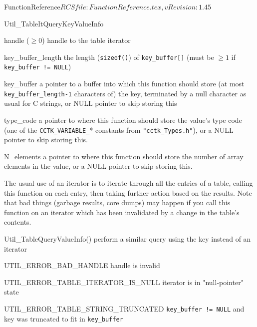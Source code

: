 \begin{cactuspart}{5}{FunctionReference}{$RCSfile: FunctionReference.tex,v $}{$Revision: 1.45 $}
\begin{FunctionDescription}{Util\_TableItQueryKeyValueInfo}
\begin{Parameter}{handle ($\ge 0$)}
handle to the table iterator
\end{Parameter}
\begin{Parameter}{key\_buffer\_length}
\quad
the length (\verb|sizeof()|) of \verb|key_buffer[]|
(must be $\ge 1$ if \verb|key_buffer != NULL|)
\end{Parameter}
\begin{Parameter}{key\_buffer}
a pointer to a buffer into which this function should store
(at most \verb|key_buffer_length-1| characters of) the key,
terminated by a null character as usual for C strings,
or NULL pointer to skip storing this
\end{Parameter}
\begin{Parameter}{type\_code}
a pointer to where this function should store the value's type code
(one of the \verb|CCTK_VARIABLE_|* constants from \verb|"cctk_Types.h"|),
or a NULL pointer to skip storing this.
\end{Parameter}
\begin{Parameter}{N\_elements}
a pointer to where this function should store
the number of array elements in the value,
or a NULL pointer to skip storing this.
\end{Parameter}

\begin{Discussion}
The usual use of an iterator is to iterate through all the entries
of a table, calling this function on each entry, then taking further
action based on the results.
\NewPar
Note that bad things (garbage results, core dumps) may happen if
you call this function on an iterator which has been invalidated
by a change in the table's contents.
\end{Discussion}

\begin{SeeAlso}{Util\_TableQueryValueInfo()}
perform a similar query using the key instead of an iterator
\end{SeeAlso}

\begin{Error}{UTIL\_ERROR\_BAD\_HANDLE}
handle is invalid
\end{Error}
\begin{Error}{UTIL\_ERROR\_TABLE\_ITERATOR\_IS\_NULL}
\quad
iterator is in "null-pointer" state
\end{Error}
\begin{Error}{UTIL\_ERROR\_TABLE\_STRING\_TRUNCATED}
\quad
\verb|key_buffer != NULL| and key was truncated to fit in \verb|key_buffer|
\end{Error}


\end{FunctionDescription}
\end{cactuspart}
